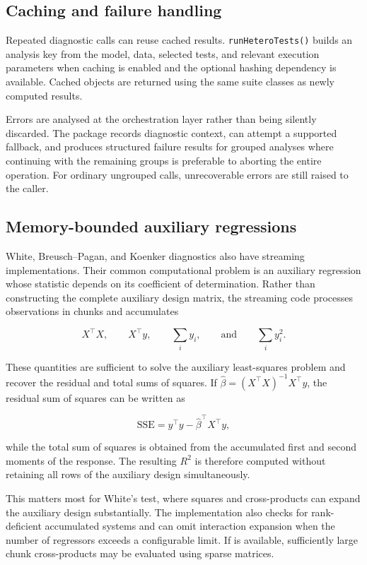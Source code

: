 \subsection{Caching and failure handling}\label{caching-and-failure-handling}

Repeated diagnostic calls can reuse cached results. \texttt{runHeteroTests()} builds
an analysis key from the model, data, selected tests, and relevant execution
parameters when caching is enabled and the optional hashing dependency is
available. Cached objects are returned using the same suite classes as newly
computed results.

Errors are analysed at the orchestration layer rather than being silently
discarded. The package records diagnostic context, can attempt a supported
fallback, and produces structured failure results for grouped analyses where
continuing with the remaining groups is preferable to aborting the entire
operation. For ordinary ungrouped calls, unrecoverable errors are still raised
to the caller.

\subsection{Memory-bounded auxiliary regressions}\label{memory-bounded-auxiliary-regressions}

White, Breusch--Pagan, and Koenker diagnostics also have streaming
implementations. Their common computational problem is an auxiliary regression
whose statistic depends on its coefficient of determination. Rather than
constructing the complete auxiliary design matrix, the streaming code processes
observations in chunks and accumulates

\[
  X^\top X, \qquad X^\top y, \qquad
  \sum_i y_i, \qquad \text{and} \qquad \sum_i y_i^2.
\]

These quantities are sufficient to solve the auxiliary least-squares problem
and recover the residual and total sums of squares. If
\(\widehat{\beta}=(X^\top X)^{-1}X^\top y\), the residual sum of squares can
be written as

\[
  \mathrm{SSE}=y^\top y-\widehat{\beta}^\top X^\top y,
\]

while the total sum of squares is obtained from the accumulated first and
second moments of the response. The resulting \(R^2\) is therefore computed
without retaining all rows of the auxiliary design simultaneously.

This matters most for White's test, where squares and cross-products can expand
the auxiliary design substantially. The implementation also checks for
rank-deficient accumulated systems and can omit interaction expansion when the
number of regressors exceeds a configurable limit. If  is
available, sufficiently large chunk cross-products may be evaluated using sparse
matrices.

